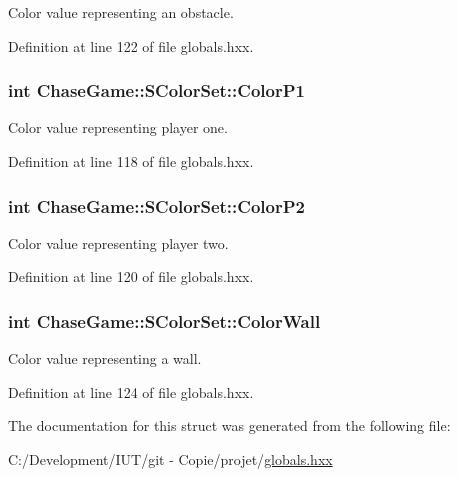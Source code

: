 Color value representing an obstacle. 



Definition at line 122 of file globals.\-hxx.

\hypertarget{struct_chase_game_1_1_s_color_set_a51e5a557359624fe92be93cb80621922}{
\subsubsection[{Color\-P1}]{\setlength{\rightskip}{0pt plus 5cm}int Chase\-Game\-::\-S\-Color\-Set\-::\-Color\-P1}}\label{struct_chase_game_1_1_s_color_set_a51e5a557359624fe92be93cb80621922}


Color value representing player one. 



Definition at line 118 of file globals.\-hxx.

\hypertarget{struct_chase_game_1_1_s_color_set_a777bce7519236b269ba44d921f54e4e8}{
\subsubsection[{Color\-P2}]{\setlength{\rightskip}{0pt plus 5cm}int Chase\-Game\-::\-S\-Color\-Set\-::\-Color\-P2}}\label{struct_chase_game_1_1_s_color_set_a777bce7519236b269ba44d921f54e4e8}


Color value representing player two. 



Definition at line 120 of file globals.\-hxx.

\hypertarget{struct_chase_game_1_1_s_color_set_a7a7a8dae118390ce5b4432aa4d99a474}{
\subsubsection[{Color\-Wall}]{\setlength{\rightskip}{0pt plus 5cm}int Chase\-Game\-::\-S\-Color\-Set\-::\-Color\-Wall}}\label{struct_chase_game_1_1_s_color_set_a7a7a8dae118390ce5b4432aa4d99a474}


Color value representing a wall. 



Definition at line 124 of file globals.\-hxx.



The documentation for this struct was generated from the following file\-:\begin{DoxyCompactItemize}
\item 
C\-:/\-Development/\-I\-U\-T/git -\/ Copie/projet/\hyperlink{globals_8hxx}{globals.\-hxx}\end{DoxyCompactItemize}
